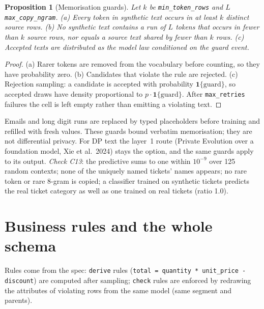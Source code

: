 \documentclass[11pt,a4paper]{article}
\newtheorem{proposition}{Proposition}
\theoremstyle{definition}
\theoremstyle{remark}
\begin{document}
\begin{proposition}[Memorisation guards]\label{prop:guard}
Let $k$ be \texttt{min\_token\_rows} and $L$ \texttt{max\_copy\_ngram}. (a) Every token in synthetic text occurs in at least $k$ distinct source rows. (b) No synthetic text contains a run of $L$ tokens that occurs in fewer than $k$ source rows, nor equals a source text shared by fewer than $k$ rows. (c) Accepted texts are distributed as the model law conditioned on the guard event.
\end{proposition}
\begin{proof}
(a) Rarer tokens are removed from the vocabulary before counting, so they have probability zero. (b) Candidates that violate the rule are rejected. (c) Rejection sampling: a candidate is accepted with probability $\mathbf 1\{\text{guard}\}$, so accepted draws have density proportional to $p\cdot\mathbf 1\{\text{guard}\}$. After \texttt{max\_retries} failures the cell is left empty rather than emitting a violating text.
\end{proof}
Emails and long digit runs are replaced by typed placeholders before training and refilled with fresh values. These guards bound verbatim memorisation; they are not differential privacy. For DP text the layer~1 route (Private Evolution over a foundation model, Xie et al.\ 2024) stays the option, and the same guards apply to its output. \emph{Check C13}: the predictive sums to one within $10^{-9}$ over 125 random contexts; none of the uniquely named tickets' names appears; no rare token or rare 8-gram is copied; a classifier trained on synthetic tickets predicts the real ticket category as well as one trained on real tickets (ratio 1.0).

\section{Business rules and the whole schema}\label{sec:rules}
Rules come from the spec: \texttt{derive} rules (\texttt{total = quantity * unit\_price - discount}) are computed after sampling; \texttt{check} rules are enforced by redrawing the attributes of violating rows from the same model (same segment and parents).
\end{document}
